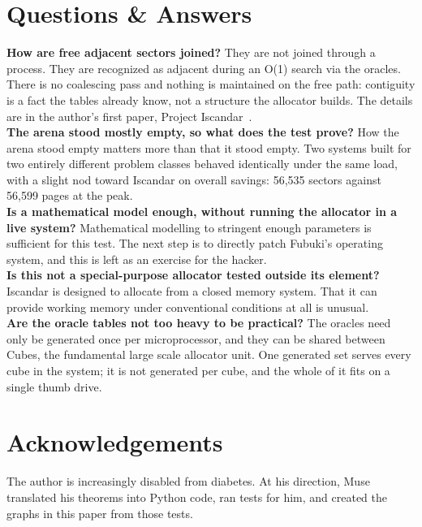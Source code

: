 \documentclass{article}
\begin{document}
\section{Questions \& Answers}

\textbf{How are free adjacent sectors joined?}
They are not joined through a process. They are recognized as adjacent during an O(1) search via the oracles. There is no coalescing pass and nothing is maintained on the free path: contiguity is a fact the tables already know, not a structure the allocator builds. The details are in the author's first paper, Project Iscandar~\cite{fine2026iscandar}.\\

\textbf{The arena stood mostly empty, so what does the test prove?}
How the arena stood empty matters more than that it stood empty. Two systems built for two entirely different problem classes behaved identically under the same load, with a slight nod toward Iscandar on overall savings: 56,535 sectors against 56,599 pages at the peak.\\

\textbf{Is a mathematical model enough, without running the allocator in a live system?}
Mathematical modelling to stringent enough parameters is sufficient for this test. The next step is to directly patch Fubuki's operating system, and this is left as an exercise for the hacker.\\

\textbf{Is this not a special-purpose allocator tested outside its element?}
Iscandar is designed to allocate from a closed memory system. That it can provide working memory under conventional conditions at all is unusual.\\

\textbf{Are the oracle tables not too heavy to be practical?}
The oracles need only be generated once per microprocessor, and they can be shared between Cubes, the fundamental large scale allocator unit. One generated set serves every cube in the system; it is not generated per cube, and the whole of it fits on a single thumb drive.

\section*{Acknowledgements}

The author is increasingly disabled from diabetes. At his direction, Muse translated his theorems into Python code, ran tests for him, and created the graphs in this paper from those tests.



\end{document}
